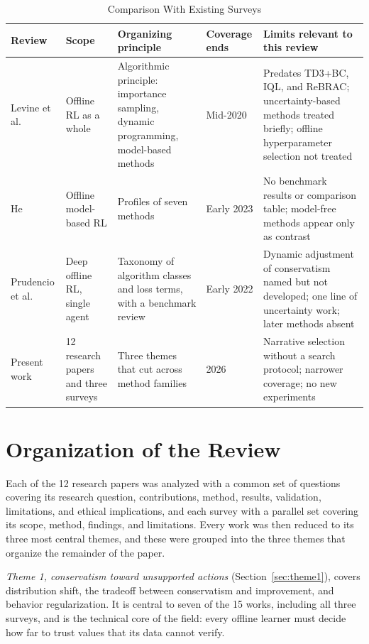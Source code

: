 \documentclass[journal]{IEEEtran}
\begin{document}
\begin{table}[!t]
\caption{Comparison With Existing Surveys}
\label{tab:surveys}
\centering
\footnotesize
\renewcommand{\arraystretch}{1.2}
\begin{tabularx}{\textwidth}{@{}P{0.13\textwidth}P{0.17\textwidth}LP{0.09\textwidth}L@{}}
\toprule
Review & Scope & Organizing principle & Coverage ends & Limits relevant to this review \\
\midrule
Levine et al. \cite{levine2020tutorial} & Offline RL as a whole & Algorithmic principle: importance sampling, dynamic programming, model-based methods & Mid-2020 & Predates TD3+BC, IQL, and ReBRAC; uncertainty-based methods treated briefly; offline hyperparameter selection not treated \\
He \cite{he2023survey} & Offline model-based RL & Profiles of seven methods & Early 2023 & No benchmark results or comparison table; model-free methods appear only as contrast \\
Prudencio et al. \cite{prudencio2024survey} & Deep offline RL, single agent & Taxonomy of algorithm classes and loss terms, with a benchmark review & Early 2022 & Dynamic adjustment of conservatism named but not developed; one line of uncertainty work; later methods absent \\
Present work & 12 research papers and three surveys & Three themes that cut across method families & 2026 & Narrative selection without a search protocol; narrower coverage; no new experiments \\
\bottomrule
\end{tabularx}
\end{table}

\section{Organization of the Review}
\label{sec:organization}
Each of the 12 research papers was analyzed with a common set of questions covering its research question, contributions, method, results, validation, limitations, and ethical implications, and each survey with a parallel set covering its scope, method, findings, and limitations. Every work was then reduced to its three most central themes, and these were grouped into the three themes that organize the remainder of the paper.

\emph{Theme 1, conservatism toward unsupported actions} (Section~\ref{sec:theme1}), covers distribution shift, the tradeoff between conservatism and improvement, and behavior regularization. It is central to seven of the 15 works, including all three surveys, and is the technical core of the field: every offline learner must decide how far to trust values that its data cannot verify.
\end{document}
